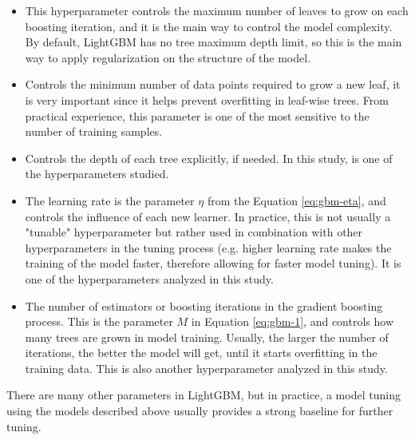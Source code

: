 \begin{itemize}

    \item \textbf{}
    
    This hyperparameter controls the maximum number of leaves to grow on each boosting iteration, and it is the main way to control the model complexity. By default, LightGBM has no tree maximum depth limit, so this is the main way to apply regularization on the structure of the model. 

    \item \textbf{}
    
    Controls the minimum number of data points required to grow a new leaf, it is very important since it helps prevent overfitting in leaf-wise trees. From practical experience, this parameter is one of the most sensitive to the number of training samples.

    \item \textbf{}
    
    Controls the depth of each tree explicitly, if needed. In this study,  is one of the hyperparameters studied.

    \item \textbf{}
    
    The learning rate is the parameter $\eta$ from the Equation \ref{eq:gbm-eta}, and controls the influence of each new learner. In practice, this is not usually a "tunable" hyperparameter but rather used in combination with other hyperparameters in the tuning process (e.g. higher learning rate makes the training of the model faster, therefore allowing for faster model tuning). It is one of the hyperparameters analyzed in this study. 

   \item \textbf{}
   
   The number of estimators or boosting iterations in the gradient boosting process. This is the parameter $M$ in Equation \ref{eq:gbm-1}, and controls how many trees are grown in model training. Usually, the larger the number of iterations, the better the model will get, until it starts overfitting in the training data. This is also another hyperparameter analyzed in this study.

\end{itemize}

There are many other parameters in LightGBM, but in practice, a model tuning using the models described above usually provides a strong baseline for further tuning.
